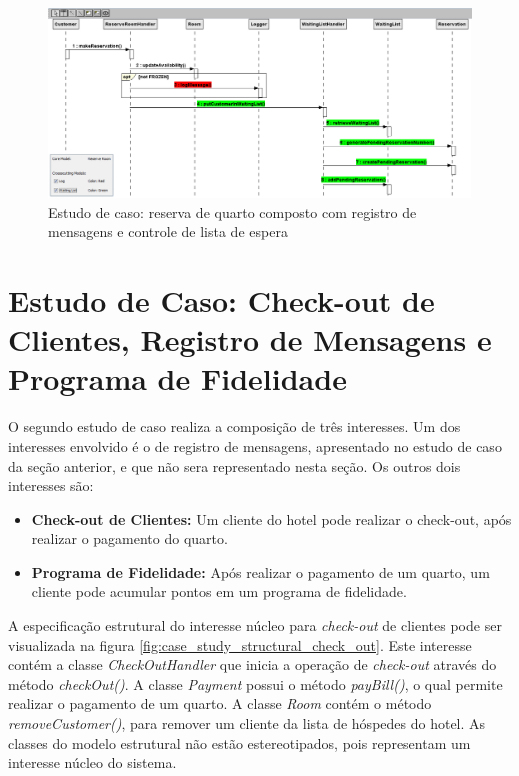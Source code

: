 \begin{landscape}
  \begin{figure}[tb]
	\centering
	\includegraphics[scale=0.7]{img/case_study_compound_2.png}
	\caption{Estudo de caso: reserva de quarto composto com registro de mensagens e controle de lista de espera}\label{fig:case_study_compound_2}
  \end{figure}
\end{landscape}
  
\section{Estudo de Caso: Check-out de Clientes, Registro de Mensagens e Programa de Fidelidade}

O segundo estudo de caso realiza a composição de três interesses. Um dos interesses envolvido é o de registro de mensagens, apresentado no estudo de
caso da seção anterior, e que não sera representado nesta seção. Os outros dois interesses são:

\begin{itemize}
  \item \textbf{Check-out de Clientes:} Um cliente do hotel pode realizar o check-out, após realizar o pagamento do quarto.
  \item \textbf{Programa de Fidelidade:} Após realizar o pagamento de um quarto, um cliente pode acumular pontos em um programa de fidelidade.
\end{itemize}

A especificação estrutural do interesse núcleo para \textit{check-out} de clientes pode ser visualizada na figura
\ref{fig:case_study_structural_check_out}. Este interesse contém a classe \textit{CheckOutHandler} que inicia a operação de \textit{check-out} através 
do método \textit{checkOut()}. A classe \textit{Payment} possui o método \textit{payBill()}, o qual permite realizar o pagamento de um quarto. A
classe \textit{Room} contém o método \textit{removeCustomer()}, para remover um cliente da lista de hóspedes do hotel. As classes do modelo estrutural
não estão estereotipados, pois representam um interesse núcleo do sistema.

